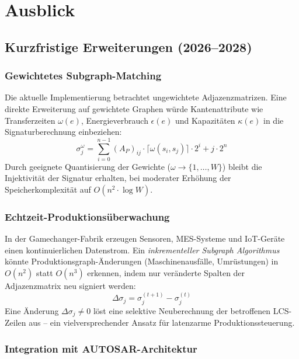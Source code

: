 ﻿\documentclass[a4paper,12pt]{article}
\theoremstyle{definition}
\begin{document}
\section{Ausblick}

\subsection{Kurzfristige Erweiterungen (2026--2028)}

\subsubsection{Gewichtetes Subgraph-Matching}

Die aktuelle Implementierung betrachtet ungewichtete Adjazenzmatrizen. Eine direkte
Erweiterung auf gewichtete Graphen \cite{zager2008graphsimilarity} würde Kantenattribute
wie Transferzeiten $\omega(e)$, Energieverbrauch $\epsilon(e)$ und Kapazitäten $\kappa(e)$
in die Signaturberechnung einbeziehen:
\[
\sigma_j^{\omega} = \sum_{i=0}^{n-1} (A_P)_{ij} \cdot \lceil \omega(s_i, s_j) \rceil \cdot 2^i + j \cdot 2^n
\]
Durch geeignete Quantisierung der Gewichte ($\omega \to \{1,\ldots,W\}$) bleibt die
Injektivität der Signatur erhalten, bei moderater Erhöhung der Speicherkomplexität
auf $O(n^2 \cdot \log W)$.

\subsubsection{Echtzeit-Produktionsüberwachung}

In der Gamechanger-Fabrik erzeugen Sensoren, MES-Systeme und IoT-Geräte einen
kontinuierlichen Datenstrom. Ein \emph{inkrementeller Subgraph Algorithmus} könnte
Produktionsgraph-Änderungen (Maschinenausfälle, Umrüstungen) in $O(n^2)$ statt $O(n^3)$
erkennen, indem nur veränderte Spalten der Adjazenzmatrix neu signiert werden:
\[
\Delta\sigma_j = \sigma_j^{(t+1)} - \sigma_j^{(t)}
\]
Eine Änderung $\Delta\sigma_j \neq 0$ löst eine selektive Neuberechnung der betroffenen
LCS-Zeilen aus -- ein vielversprechender Ansatz für latenzarme Produktionssteuerung.

\subsubsection{Integration mit AUTOSAR-Architektur}
\end{document}
